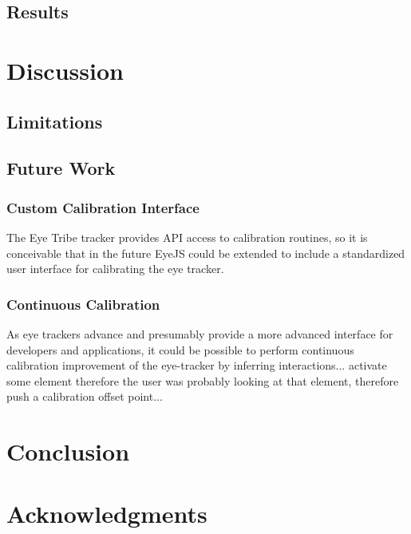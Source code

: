 \documentclass{sigchi}
\begin{document}
\subsection{Results}

\section{Discussion}

\subsection{Limitations}

\subsection{Future Work}

\subsubsection{Custom Calibration Interface}
The Eye Tribe tracker provides API access to calibration routines, so
it is conceivable that in the future EyeJS could be extended to include
a standardized user interface for calibrating the eye tracker.

\subsubsection{Continuous Calibration}
As eye trackers advance and presumably provide a more advanced interface
for developers and applications, it could be possible to perform
continuous calibration improvement of the eye-tracker by inferring
interactions... activate some element therefore the user was probably
looking at that element, therefore push a calibration offset point...

\section{Conclusion}

\section{Acknowledgments}

\balance{}



\end{document}
